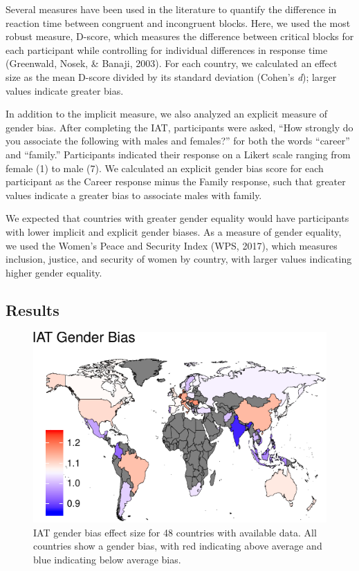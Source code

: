 \documentclass[10pt, letterpaper]{article}
\newenvironment{CodeChunk}{}{}
\begin{document}
Several measures have been used in the literature to quantify the
difference in reaction time between congruent and incongruent blocks.
Here, we used the most robust measure, D-score, which measures the
difference between critical blocks for each participant while
controlling for individual differences in response time (Greenwald,
Nosek, \& Banaji, 2003). For each country, we calculated an effect size
as the mean D-score divided by its standard deviation (Cohen's
\emph{d}); larger values indicate greater bias.

In addition to the implicit measure, we also analyzed an explicit
measure of gender bias. After completing the IAT, participants were
asked, ``How strongly do you associate the following with males and
females?'' for both the words ``career'' and ``family.'' Participants
indicated their response on a Likert scale ranging from female (1) to
male (7). We calculated an explicit gender bias score for each
participant as the Career response minus the Family response, such that
greater values indicate a greater bias to associate males with family.

We expected that countries with greater gender equality would have
participants with lower implicit and explicit gender biases. As a
measure of gender equality, we used the Women's Peace and Security Index
(WPS, 2017), which measures inclusion, justice, and security of women by
country, with larger values indicating higher gender equality.

\subsection{Results}\label{results}

\begin{CodeChunk}
\begin{figure}[t]

{\centering \includegraphics{figs/map-1} 

}

\caption[IAT gender bias effect size for 48 countries with available data]{IAT gender bias effect size for 48 countries with available data. All countries show a gender bias, with red indicating above average and blue indicating below average bias.}\label{fig:map}
\end{figure}
\end{CodeChunk}
\end{document}
